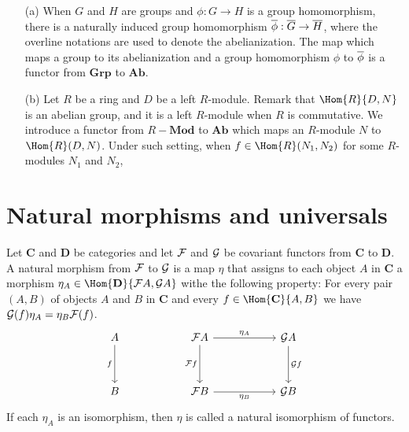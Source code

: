 \begin{exmp}
    \begin{enumerate}
        \item[(a)]
        {
            When $G$ and $H$ are groups and $\phi: G\rightarrow H$ is a group homomorphism, there is a naturally induced group homomorphism $\overline{\phi}: \overline{G}\rightarrow \overline{H}$, where the overline notations are used to denote the abelianization.
            The map which maps a group to its abelianization and a group homomorphism $\phi$ to $\overline{\phi}$ is a functor from $\textbf{Grp}$ to $\textbf{Ab}$.
        }
        \item[(b)]
        {
            Let $R$ be a ring and $D$ be a left $R$-module.
            Remark that $\Hom{R}{D, N}$ is an abelian group, and it is a left $R$-module when $R$ is commutative.
            We introduce a functor from $R-\textbf{Mod}$ to $\textbf{Ab}$ which maps an $R$-module $N$ to $\Hom{R}(D, N)$.
            Under such setting, when $f\in\Hom{R}(N_1, N_2)$ for some $R$-modules $N_1$ and $N_2$, 
        }
    \end{enumerate}
\end{exmp}

\section{Natural morphisms and universals}

\begin{defi}
    Let $\textbf{C}$ and $\textbf{D}$ be categories and let ${\mathcal{F}}$ and ${\mathcal{G}}$ be covariant functors from $\textbf{C}$ to $\textbf{D}$.
    A natural morphism from ${\mathcal{F}}$ to ${\mathcal{G}}$ is a map $\eta$ that assigns to each object $A$ in $\textbf{C}$ a morphism $\eta_A\in\Hom{\textbf{D}}{\mc{F}A, \mc{G}A}$ withe the following property:
    For every pair $(A, B)$ of objects $A$ and $B$ in $\textbf{C}$ and every $f\in\Hom{\textbf{C}}{A, B}$ we have ${\mathcal{G}}(f)\eta_A=\eta_B{\mathcal{F}}(f)$.
    \begin{equation*}
    \begin{tikzcd}[row sep=1.2cm, column sep=2.0cm]
        A
        \arrow[d, "f"']
        &
        \mc{F}A
        \arrow[d, "\mc{F}f"']
        \arrow[r, "\eta_A"]
        &
        \mc{G}A
        \arrow[d, "\mc{G}f"]
        \\
        B
        &
        \mc{F}B
        \arrow[r, "\eta_B"']
        &
        \mc{G}B
    \end{tikzcd}
    \end{equation*}
    If each $\eta_A$ is an isomorphism, then $\eta$ is called a natural isomorphism of functors.
\end{defi}


